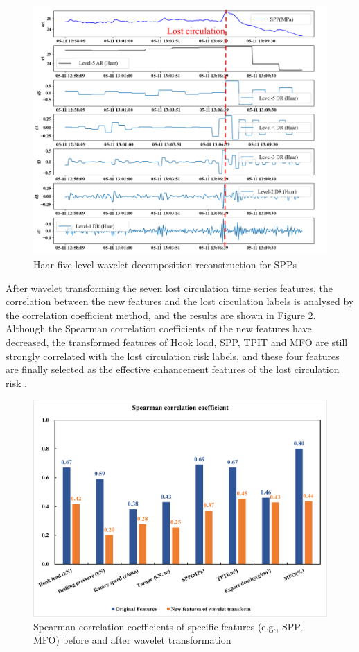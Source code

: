 \documentclass[journal,article,submit,pdftex,moreauthors]{Definitions/mdpi}
\begin{document}
\begin{figure}[H]
    \centering
    \includegraphics[width=0.75\linewidth]{图片/5级小波分解.png}
    \caption{Haar five-level wavelet decomposition reconstruction for SPPs}
    \label{fig:Haar five-level wavelet decomposition reconstruction for SPPs}
\end{figure}

After wavelet transforming the seven  lost circulation time series features, the correlation between the new features and the  lost circulation labels is analysed by the correlation coefficient method, and the results are shown in Figure  \ref{fig:Spearman correlation coefficients of features before and after wavelet transformation}. Although the Spearman correlation coefficients of the new features have decreased, the transformed features of Hook load, SPP, TPIT and MFO are still strongly correlated with the lost circulation risk labels, and these four features are finally selected as the effective enhancement features of the lost circulation risk .

\begin{figure}[H]
    \centering
    \includegraphics[width=0.75\linewidth]{图片/spearman相关系数.png}
    \caption{Spearman correlation coefficients of specific features (e.g., SPP, MFO) before and after wavelet transformation}
    \label{fig:Spearman correlation coefficients of features before and after wavelet transformation}
\end{figure}
\end{document}
